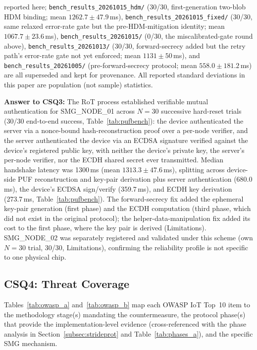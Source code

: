 \documentclass[preprint,12pt,authoryear]{elsarticle}
\begin{document}
reported here; \texttt{bench\_results\_20261015\_hdm/} (30/30, first-generation two-blob HDM binding; mean $1262.7\pm47.9$\,ms), \texttt{bench\_results\_20261015\_fixed/} (30/30, same relaxed error-rate gate but the pre-HDM-mitigation identity; mean $1067.7\pm23.6$\,ms), \texttt{bench\_results\_20261015/} (0/30, the miscalibrated-gate round above), \texttt{bench\_results\_20261013/} (30/30, forward-secrecy added but the retry path's error-rate gate not yet enforced; mean $1131\pm50$\,ms), and \texttt{bench\_results\_20261005/} (pre-forward-secrecy protocol; mean $558.0\pm181.2$\,ms) are all superseded and kept for provenance. All reported standard deviations in this paper are population (not sample) statistics.

\textbf{Answer to CSQ3:} The RoT process established verifiable mutual authentication for SMG\_NODE\_01 across $N=30$ successive hard-reset trials (30/30 end-to-end success, Table~\ref{tab:pufbench}): the device authenticated the server via a nonce-bound hash-reconstruction proof over a per-node verifier, and the server authenticated the device via an ECDSA signature verified against the device's registered public key, with neither the device's private key, the server's per-node verifier, nor the ECDH shared secret ever transmitted. Median handshake latency was 1300\,ms (mean $1313.3 \pm 47.6$\,ms), splitting across device-side PUF reconstruction and key-pair derivation plus server authentication (680.0\,ms), the device's ECDSA sign/verify (359.7\,ms), and ECDH key derivation (273.7\,ms, Table~\ref{tab:pufbench}). The forward-secrecy fix added the ephemeral key-pair generation (first phase) and the ECDH computation (third phase, which did not exist in the original protocol); the helper-data-manipulation fix added its cost to the first phase, where the key pair is derived (Limitations). SMG\_NODE\_02 was separately registered and validated under this scheme (own $N=30$ trial, 30/30, Limitations), confirming the reliability profile is not specific to one physical chip.

\subsection{CSQ4: Threat Coverage}
\label{subsec:csq4}

Tables~\ref{tab:owasp_a} and~\ref{tab:owasp_b} map each OWASP IoT Top~10 item to the methodology stage(s) mandating the countermeasure, the protocol phase(s) that provide the implementation-level evidence (cross-referenced with the phase analysis in Section~\ref{subsec:strideprot} and Table~\ref{tab:phases_a}), and the specific SMG mechanism.
\end{document}
